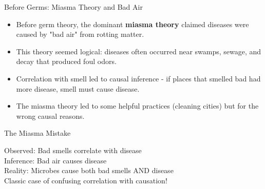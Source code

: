 \documentclass{beamer}
\begin{document}
	\begin{frame}{Before Germs: Miasma Theory and Bad Air}
		\begin{itemize}
			\item Before germ theory, the dominant \textbf{miasma theory} claimed diseases were caused by "bad air" from rotting matter.
			\item This theory seemed logical: diseases often occurred near swamps, sewage, and decay that produced foul odors.
			\item Correlation with smell led to causal inference - if places that smelled bad had more disease, smell must cause disease.
			\item The miasma theory led to some helpful practices (cleaning cities) but for the wrong causal reasons.
		\end{itemize}
		
		\begin{block}{The Miasma Mistake}
			\begin{center}
				Observed: Bad smells correlate with disease\\
				Inference: Bad air causes disease\\
				Reality: Microbes cause both bad smells AND disease\\
				\vspace{0.2cm}
				Classic case of confusing correlation with causation!
			\end{center}
		\end{block}
	\end{frame}
	
\end{document}
